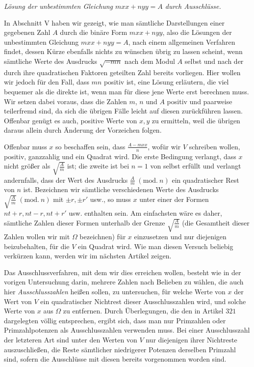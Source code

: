 \begin{center}\textit{Lösung der unbestimmten Gleichung \(mxx+nyy=A\) durch Ausschlüsse.}\end{center}


In Abschnitt V haben wir gezeigt, wie man sämtliche Darstellungen einer gegebenen Zahl \(A\) durch die binäre Form \(mxx+nyy\),
also die Lösungen der unbestimmten Gleichung \(mxx+nyy=A\), nach einem allgemeinen Verfahren findet, dessen Kürze ebenfalls nichts zu wünschen übrig zu lassen scheint, wenn sämtliche Werte des Ausdrucks \(\surd{-mn}\) nach dem Modul \(A\) selbst und nach der durch ihre quadratischen Faktoren geteilten Zahl bereits vorliegen. Hier wollen wir jedoch für den Fall, dass \(mn\) positiv ist, eine Lösung erläutern, die viel bequemer als die direkte ist, wenn man für diese jene Werte erst berechnen muss. Wir setzen dabei voraus, dass die Zahlen \(m\), \(n\) und \(A\) positiv und paarweise teilerfremd sind, da sich die übrigen Fälle leicht auf diesen zurückführen lassen. Offenbar genügt es auch, positive Werte von \(x,\allowbreak y\) zu ermitteln, weil die übrigen daraus allein durch Änderung der Vorzeichen folgen.

Offenbar muss \(x\) so beschaffen sein, dass \(\frac{A-mxx}{n}\), wofür wir \(V\) schreiben wollen, positiv, ganzzahlig und ein Quadrat wird. Die erste Bedingung verlangt, dass \(x\) nicht größer als \(\surd{\frac Am}\) ist; die zweite ist bei \(n=1\) von selbst erfüllt und verlangt andernfalls, dass der Wert des Ausdrucks \(\frac Am\; (\mathrm{mod}.\ n)\) ein quadratischer Rest von \(n\) ist. Bezeichnen wir sämtliche verschiedenen Werte des Ausdrucks \(\surd{\frac Am}\; (\mathrm{mod}.\ n)\) mit \(\pm r,\allowbreak \pm r'\) usw., so muss \(x\) unter einer der Formen \(nt+r,\allowbreak nt-r,\allowbreak nt+r'\) usw. enthalten sein. Am einfachsten wäre es daher, sämtliche Zahlen dieser Formen unterhalb der Grenze \(\surd{\frac Am}\) (die Gesamtheit dieser Zahlen wollen wir mit \(\Omega\) bezeichnen) für \(x\) einzusetzen und nur diejenigen beizubehalten, für die \(V\) ein Quadrat wird. Wie man diesen Versuch beliebig verkürzen kann, werden wir im nächsten Artikel zeigen.

Das Ausschlussverfahren, mit dem wir dies erreichen wollen, besteht wie in der vorigen Untersuchung darin, mehrere Zahlen nach Belieben zu wählen, die auch hier \textit{Ausschlusszahlen} heißen sollen, zu untersuchen, für welche Werte von \(x\) der Wert von \(V\) ein quadratischer Nichtrest dieser Ausschlusszahlen wird, und solche Werte von \(x\) aus \(\Omega\) zu entfernen. Durch Überlegungen, die den in Artikel \(321\) dargelegten völlig entsprechen, ergibt sich, dass man nur Primzahlen oder Primzahlpotenzen als Ausschlusszahlen verwenden muss. Bei einer Ausschlusszahl der letzteren Art sind unter den Werten von \(V\) nur diejenigen ihrer Nichtreste auszuschließen, die Reste sämtlicher niedrigerer Potenzen derselben Primzahl sind, sofern die Ausschlüsse mit diesen bereits vorgenommen worden sind.

